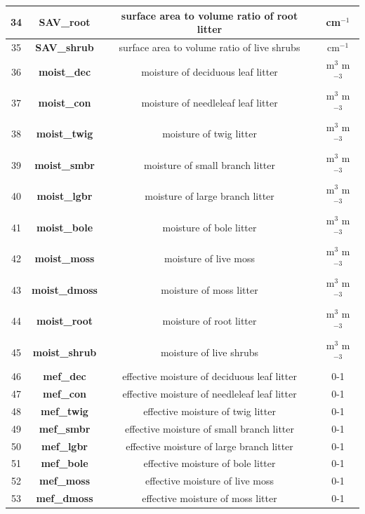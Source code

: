 \documentclass[a4paper, 12pt] {article}
\begin{document}
\begin{table} [H]
{\begin{tabular}{|c|c|c|c|}
			\hline 
			34 & \textbf{SAV\_root} & surface area to volume ratio of root litter & cm$^{-1}$  \\
			\hline 
			35 & \textbf{SAV\_shrub} & surface area to volume ratio of live shrubs & cm$^{-1}$  \\
			\hline 
			36 & \textbf{moist\_dec} & moisture of deciduous leaf litter &  m$^3$ m$^{-3}$   \\
			\hline 
			37 & \textbf{moist\_con} &  moisture of needleleaf leaf litter  & m$^3$ m$^{-3}$   \\
			\hline 
			38 & \textbf{moist\_twig} & moisture of twig litter   & m$^3$ m$^{-3}$   \\
			\hline 
			39 & \textbf{moist\_smbr} & moisture of small branch litter  & m$^3$ m$^{-3}$    \\
			\hline 
			40 & \textbf{moist\_lgbr} & moisture of large branch litter  & m$^3$ m$^{-3}$   \\
			\hline 
			41 & \textbf{moist\_bole} & moisture of bole litter & m$^3$ m$^{-3}$   \\
			\hline 
			42 & \textbf{moist\_moss} & moisture of live moss & m$^3$ m$^{-3}$    \\
			\hline 
			43 & \textbf{moist\_dmoss} & moisture of moss litter & m$^3$ m$^{-3}$   \\
			\hline 
			44 & \textbf{moist\_root} & moisture of root litter & m$^3$ m$^{-3}$   \\
			\hline 
			45 & \textbf{moist\_shrub} & moisture of live shrubs & m$^3$ m$^{-3}$   \\
			\hline 
			46 & \textbf{mef\_dec} & effective moisture of deciduous leaf litter &  0-1   \\
			\hline 
			47 & \textbf{mef\_con} &  effective moisture of needleleaf leaf litter  & 0-1     \\
			\hline 
			48 & \textbf{mef\_twig} & effective moisture of twig litter   & 0-1    \\
			\hline 
			49 & \textbf{mef\_smbr} & effective moisture of small branch litter  & 0-1      \\
			\hline 
			50 & \textbf{mef\_lgbr} & effective moisture of large branch litter  & 0-1    \\
			\hline 
			51 & \textbf{mef\_bole} & effective moisture of bole litter & 0-1     \\
			\hline 
			52 & \textbf{mef\_moss} & effective moisture of live moss & 0-1     \\
			\hline 
			53 & \textbf{mef\_dmoss} & effective moisture of moss litter & 0-1     \\

\end{tabular}}
\end{table}
\end{document}
